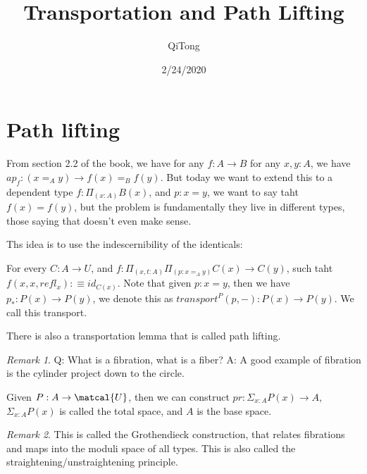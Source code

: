 \documentclass[12pt]{article}%
\title{Transportation and Path Lifting} %
\author{QiTong} %
\date{2/24/2020} %
\theoremstyle{definition}
\theoremstyle{remark}
\newtheorem*{remark}{Remark} %
\theoremstyle{definition}
\theoremstyle{definition}
\begin{document}
\maketitle %

\noindent %

\tableofcontents %

\section{Path lifting} 

From section 2.2 of the book, we have for any $f: A \rightarrow B$ for any $x,y:A$, we have $ap_f: (x =_A y) \rightarrow f(x) =_B f(y)$. But today we want to extend this to a dependent type $f: \Pi_{(x :A)} B(x)$, and $p: x = y$, we want to say taht $f(x) = f(y)$, but the problem is fundamentally they live in different types, those saying that doesn't even make sense.

Ths idea is to use the indescernibility of the identicals:

For every $C : A \rightarrow U$, and $f : \Pi_{(x,t :A)} \Pi_{(p : x =_A y)} C(x) \rightarrow C(y)$, such taht $f(x,x,refl_x) : \equiv id_{C(x)}$. Note that given $p : x = y$, then we have $p_* : P(x) \rightarrow P(y)$, we denote this as $transport^P(p,-): P(x) \rightarrow P(y)$. We call this transport.

There is also a transportation lemma that is called path lifting.

\begin{remark} 
Q: What is a fibration, what is a fiber? 
A: A good example of fibration is the cylinder project down to the circle.


\end{remark}

Given $P: A \rightarrow \matcal{U}$, then we can construct $pr:\Sigma_{x:A} P(x) \rightarrow A$, $\Sigma_{x:A}P(x)$ is called the total space, and $A$ is the base space. 

\begin{remark}
This is called the Grothendieck construction, that relates fibrations and maps into the moduli space of all types. This is also called the straightening/unstraightening principle.
\end{remark}
\end{document}
